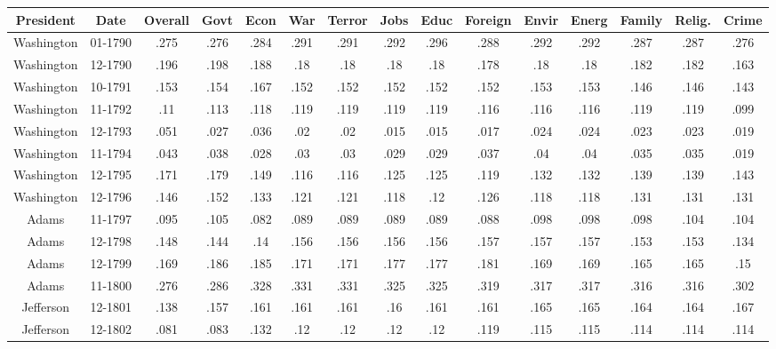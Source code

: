 \begin{sidewaystable}
\begin{singlespace}
\begin{center}
 \begin{tabular}{||c c c c c c c c c c c c c c c||}
 \hline
 President & Date & Overall & Govt & Econ & War & Terror & Jobs & Educ & Foreign & Envir & Energ & Family & Relig. & Crime \\
 \hline\hline
 Washington & 01-1790 & .275 & .276 & .284 & .291 & .291 & .292 & .296 & .288 & .292 & .292 & .287 & .287 & .276 \\ 
\hline
Washington & 12-1790 & .196 & .198 & .188 & .18 & .18 & .18 & .18 & .178 & .18 & .18 & .182 & .182 & .163 \\ 
\hline
Washington & 10-1791 & .153 & .154 & .167 & .152 & .152 & .152 & .152 & .152 & .153 & .153 & .146 & .146 & .143 \\ 
\hline
Washington & 11-1792 & .11 & .113 & .118 & .119 & .119 & .119 & .119 & .116 & .116 & .116 & .119 & .119 & .099 \\ 
\hline
Washington & 12-1793 & .051 & .027 & .036 & .02 & .02 & .015 & .015 & .017 & .024 & .024 & .023 & .023 & .019 \\ 
\hline
Washington & 11-1794 & .043 & .038 & .028 & .03 & .03 & .029 & .029 & .037 & .04 & .04 & .035 & .035 & .019 \\ 
\hline
Washington & 12-1795 & .171 & .179 & .149 & .116 & .116 & .125 & .125 & .119 & .132 & .132 & .139 & .139 & .143 \\ 
\hline
Washington & 12-1796 & .146 & .152 & .133 & .121 & .121 & .118 & .12 & .126 & .118 & .118 & .131 & .131 & .131 \\ 
\hline
Adams & 11-1797 & .095 & .105 & .082 & .089 & .089 & .089 & .089 & .088 & .098 & .098 & .098 & .104 & .104 \\ 
\hline
Adams & 12-1798 & .148 & .144 & .14 & .156 & .156 & .156 & .156 & .157 & .157 & .157 & .153 & .153 & .134 \\ 
\hline
Adams & 12-1799 & .169 & .186 & .185 & .171 & .171 & .177 & .177 & .181 & .169 & .169 & .165 & .165 & .15 \\ 
\hline
Adams & 11-1800 & .276 & .286 & .328 & .331 & .331 & .325 & .325 & .319 & .317 & .317 & .316 & .316 & .302 \\ 
\hline
Jefferson & 12-1801 & .138 & .157 & .161 & .161 & .161 & .16 & .161 & .161 & .165 & .165 & .164 & .164 & .167 \\ 
\hline
Jefferson & 12-1802 & .081 & .083 & .132 & .12 & .12 & .12 & .12 & .119 & .115 & .115 & .114 & .114 & .114 \\ 

\end{tabular}
\end{center}
\end{singlespace}
\end{sidewaystable}
